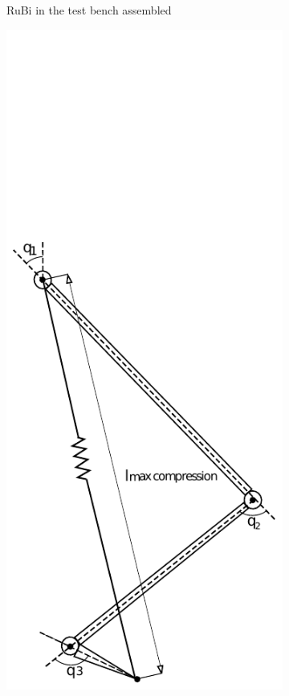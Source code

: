 \begin{figure}[ht!]
\begin{subfigure}[b]{0.25\textwidth}
        \caption{RuBi in the test bench assembled}
        \label{fig:virtual_spring1}
    \end{subfigure}
    \begin{subfigure}[b]{0.25\textwidth}
        \includegraphics[width=\textwidth]{figures/spring_model_max_compressed.pdf}

\end{subfigure}
\end{figure}
